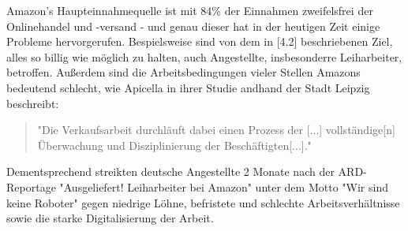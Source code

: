 Amazon’s Haupteinnahmequelle ist mit 84\% der Einnahmen zweifelsfrei der Onlinehandel und -versand\cite[Abb. 5]{Desjardins} - und genau dieser hat in der heutigen Zeit einige Probleme hervorgerufen. Bespielsweise sind von dem in [4.2] beschriebenen Ziel, alles so billig wie möglich zu halten, auch Angestellte, insbesonderre Leiharbeiter, betroffen\cite[S. 6]{Apicella}. Außerdem sind die Arbeitsbedingungen vieler Stellen Amazons bedeutend schlecht, wie Apicella in ihrer Studie andhand der Stadt Leipzig beschreibt\cite[S. 29]{Apicella}:
\begin{quote}
"Die Verkaufsarbeit durchläuft dabei einen Prozess der [...] vollständige[n] Überwachung und Disziplinierung der Beschäftigten[...]."
\end{quote}
Dementsprechend streikten deutsche Angestellte 2 Monate nach der ARD-Reportage "Ausgeliefert! Leiharbeiter bei Amazon"\cite{Ausgeliefert} unter dem Motto "Wir sind keine Roboter" gegen niedrige Löhne, befristete und schlechte Arbeitsverhältnisse sowie die starke Digitalisierung der Arbeit\cite[S. 6]{Apicella}.



\iffalse

dynamic pricing https://www.exeo-consulting.com/pdf/exeo_Dynamic%

Arbeitsbedingungen https://www.rosalux.de/fileadmin/rls_uploads/pdfs/Studien/Studien_09-16_Amazon_Leipzig.pdf


  >billg-wettbewerb: amazon macht tlw. verlust, um andere zu verdrängen, zB Prime Versand an einem Tag
  >verbilligung: Lohn und Arbeitsbedingungen schlecht "verbilligung nicht nur auf kosten des Gewinns, sondern auch der Arbeiter"



>CORONA, besordere Artikel wie Toilettenpapier oder desinfektionsmittel

>WEGSCHMEI?EN ABGELAUFENER LEBENSMITTEL > onlinehandel wenoger sclimm weil spielraum
-> TAUSCH REINFFOLGE   AMAZON - AUSWIRKUNGEN ONLINEHANDEL AUF INFRASTRUKTUR
DIE IN 5.1 BESCHRIEBENE AUSBEUTUNG UND VERBILLIGUNG WURDE GRÖ?TENTEILS DURCH AMZON HERVORGERUFEN

>Ausnutzung
>Kontakt mit Amazon

>Schlussfolgerungen: auf Tühringen übertragbar, weil 

9.3 Schlussfolgerungen*/
\fi
